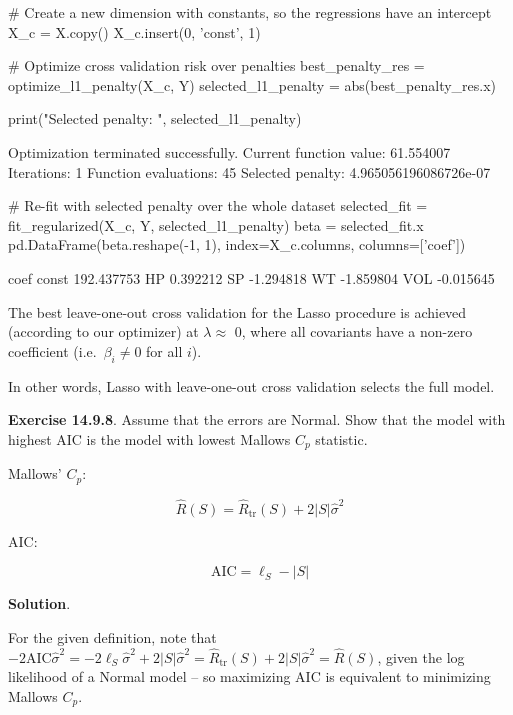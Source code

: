 \begin{python}
# Create a new dimension with constants, so the regressions have an intercept
X_c = X.copy()
X_c.insert(0, 'const', 1)
\end{python}

\begin{python}
# Optimize cross validation risk over penalties
best_penalty_res = optimize_l1_penalty(X_c, Y)
selected_l1_penalty = abs(best_penalty_res.x)

print("Selected penalty: ", selected_l1_penalty)
\end{python}

\begin{console}
Optimization terminated successfully.
         Current function value: 61.554007
         Iterations: 1
         Function evaluations: 45
Selected penalty:  4.965056196086726e-07
\end{console}

\begin{python}
# Re-fit with selected penalty over the whole dataset
selected_fit = fit_regularized(X_c, Y, selected_l1_penalty)
beta = selected_fit.x
pd.DataFrame(beta.reshape(-1, 1), index=X_c.columns, columns=['coef'])
\end{python}

\begin{console}
             coef
const  192.437753
HP       0.392212
SP      -1.294818
WT      -1.859804
VOL     -0.015645
\end{console}

The best leave-one-out cross validation for the Lasso procedure is
achieved (according to our optimizer) at \(\lambda \approx\) 0, where
all covariants have a non-zero coefficient (i.e.~\(\beta_{i} \neq 0\) for
all \(i\)).

In other words, Lasso with leave-one-out cross validation selects the
full model.

\textbf{Exercise 14.9.8}. Assume that the errors are Normal. Show that
the model with highest AIC is the model with lowest Mallows \(C_p\)
statistic.

Mallows' \(C_p\):

\[\hat{R}(S) = \hat{R}_\text{tr}(S) + 2 |S| \hat{\sigma}^{2}\]

AIC:

\[  \text{AIC} = \ell_S - |S|\]

\textbf{Solution}.

For the given definition, note that
\(-2 \text{AIC} \hat{\sigma}^{2} = -2 \ell_S \hat{\sigma}^{2} + 2|S| \hat{\sigma}^{2} = \hat{R}_\text{tr}(S) + 2 |S| \hat{\sigma}^{2} = \hat{R}(S)\),
given the log likelihood of a Normal model -- so maximizing AIC is
equivalent to minimizing Mallows \(C_p\).

